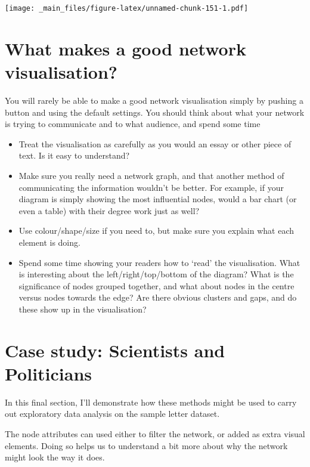 \documentclass[
]{book}
\begin{document}
\texttt{[image: \_main\_files/figure-latex/unnamed-chunk-151-1.pdf]}

\hypertarget{what-makes-a-good-network-visualisation}{%
\section{What makes a good network visualisation?}\label{what-makes-a-good-network-visualisation}}

You will rarely be able to make a good network visualisation simply by pushing a button and using the default settings. You should think about what your network is trying to communicate and to what audience, and spend some time

\begin{itemize}
\item
  Treat the visualisation as carefully as you would an essay or other piece of text. Is it easy to understand?
\item
  Make sure you really need a network graph, and that another method of communicating the information wouldn't be better. For example, if your diagram is simply showing the most influential nodes, would a bar chart (or even a table) with their degree work just as well?
\item
  Use colour/shape/size if you need to, but make sure you explain what each element is doing.
\item
  Spend some time showing your readers how to `read' the visualisation. What is interesting about the left/right/top/bottom of the diagram? What is the significance of nodes grouped together, and what about nodes in the centre versus nodes towards the edge? Are there obvious clusters and gaps, and do these show up in the visualisation?
\end{itemize}

\hypertarget{case-study-scientists-and-politicians}{%
\section{Case study: Scientists and Politicians}\label{case-study-scientists-and-politicians}}

In this final section, I'll demonstrate how these methods might be used to carry out exploratory data analysis on the sample letter dataset.

The node attributes can used either to filter the network, or added as extra visual elements. Doing so helps us to understand a bit more about why the network might look the way it does.
\end{document}
